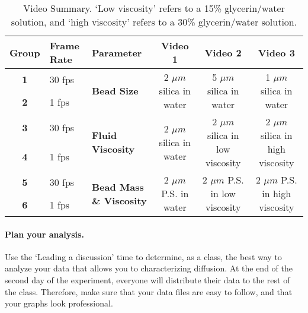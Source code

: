 %
\begin{table}[ht]
\centering
\begin{tabular}{|c|p{1.5cm}|p{2.4cm}|c|c|c|}
\hline
\textbf{Group} & \textbf{Frame Rate} & \textbf{Parameter} & \textbf{Video 1} & \textbf{Video 2} & \textbf{Video 3} \\ \hline
\textbf{1} & 30 fps & \multirow{2}{2.4cm}{\textbf{Bead Size}} & \multirow{2}{2.3cm}{2 $\mu m$ silica in water} & \multirow{2}{3cm}{5 $\mu m$ silica in water} & \multirow{2}{3cm}{1 $\mu m$ silica in water} \\ \cline{1-2}
\textbf{2} & 1 fps &  &  &  &  \\ \hline
\textbf{3} & 30 fps  & \multirow{2}{2.4cm}{\textbf{Fluid Viscosity}} & \multirow{2}{2.3cm}{2 $\mu m$ silica in water} & \multirow{2}{3cm}{2 $\mu m$ silica in low viscosity} & \multirow{2}{3cm}{2 $\mu m$ silica in high viscosity} \\ \cline{1-2}
\textbf{4} & 1 fps & & & & \\ \hline
\textbf{5} & 30 fps & \multirow{2}{2.4cm}{\textbf{Bead Mass \& Viscosity}} & \multirow{2}{2.2cm}{2 $\mu m$ P.S. in water} & \multirow{2}{2.8cm}{2 $\mu m$ P.S. in low viscosity} & \multirow{2}{3cm}{2 $\mu m$ P.S. in high viscosity} \\ \cline{1-2}
\textbf{6} & 1 fps & & & & \\ \hline
\end{tabular}
\caption{Video Summary. `Low viscosity' refers to a 15\% glycerin/water solution, and `high viscosity' refers to a 30\% glycerin/water solution.}
\label{tab:exp3video_v2}
\end{table}

\paragraph*{Plan your analysis.} Use the `Leading a discussion' time to determine, as a class, the best way to analyze your data that allows you to characterizing diffusion.
At the end of the second day of the experiment,  everyone will distribute their data to the rest of the class.
Therefore, make sure that your data files are easy to follow, and that your graphs look professional.


